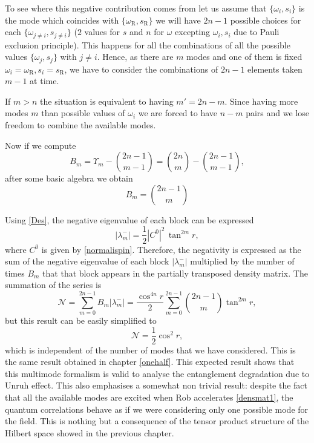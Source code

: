 To see where this negative contribution comes from let us assume that $\{\omega_i,s_i\}$ is the mode which coincides with $\{\omega_\text{R},s_\text{R}\}$ we will have $2n-1$ possible choices for each $\{\omega_{j\neq i},s_{j\neq i}\}$ ($2$ values for $s$ and $n$ for $\omega$ excepting $\omega_i,s_i$ due to Pauli exclusion principle). This happens for all the combinations of all the possible values $\{\omega_j,s_j\}$ with $j\neq i$. Hence, as there are $m$ modes and one of them is fixed $\omega_i=\omega_\text{R}, s_i=s_\text{R}$, we have to consider the combinations of $2n-1$ elements taken $m-1$ at time.

If $m>n$ the situation is equivalent to having $m'=2n-m$. Since having more modes $m$ than possible values of $\omega_i$ we are forced to have $n-m$ pairs and we lose freedom to combine the available modes.

Now if we compute
\begin{equation}\label{Nblocksap}B_m=\Upsilon_m-\binom{2n-1}{m-1}=\binom{2n}{m}-\binom{2n-1}{m-1},
\end{equation}
after some basic algebra we obtain
\begin{equation}\label{Nblocks3m}B_m=\binom{2n-1}{m}\end{equation}

Using \eqref{Des}, the negative eigenvalue of each block can be expressed
\begin{equation}\label{neigenb}
|\lambda^-_m|=\frac12|C^0|^2\,\tan^{2m} r,
\end{equation}
where $C^0$ is given by \eqref{normalispin}. Therefore, the negativity is expressed as the sum of the negative eigenvalue of each block $|\lambda_m^-|$ multiplied by the number of times $B_m$ that that block appears in the partially transposed density matrix. The 
summation of the series is
\begin{equation}\label{negativitypre1}
\mathcal{N}=\sum_{m=0}^{2n-1} B_m|\lambda^-_m|=\frac{\cos^{4n}r}{2}\sum_{m=0}^{2n-1}\binom{2n-1}{m}\tan^{2m}r ,
\end{equation}
but this result can be easily simplified to
\begin{equation}\label{negativitypre}
\mathcal{N}=\frac12\cos^2 r,
\end{equation}
which is independent of the number of modes that we have considered. This is the same result obtained in chapter \ref{onehalf}. This expected result shows that this multimode formalism is valid to analyse the entanglement degradation due to Unruh effect. This also emphasises a somewhat non trivial result: despite the fact that all the available modes are excited when Rob accelerates \eqref{densmat1}, the quantum correlations behave as if we were considering only one possible mode for the field. This is nothing but a consequence of the tensor product structure of the Hilbert space showed in the previous chapter.

